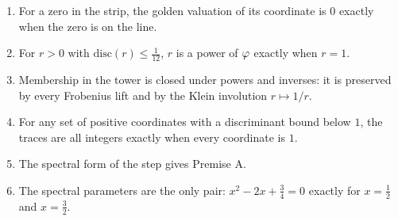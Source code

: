 \begin{proposition}\label{prop:step-coordinate}
\begin{enumerate}[label=\textup{(\roman*)}]
  \item For a zero in the strip, the golden valuation of its coordinate is $0$
    exactly when the zero is on the line.
  \item For $r>0$ with $\mathrm{disc}(r)\le\tfrac1{12}$, $r$ is a power of $\varphi$
    exactly when $r=1$.
  \item Membership in the tower is closed under powers and inverses: it is preserved
    by every Frobenius lift and by the Klein involution $r\mapsto1/r$.
  \item For any set of positive coordinates with a discriminant bound below $1$, the
    traces are all integers exactly when every coordinate is $1$.
  \item The spectral form of the step gives Premise A.
  \item The spectral parameters are the only pair: $x^2-2x+\tfrac34=0$ exactly for
    $x=\tfrac12$ and $x=\tfrac32$.
\end{enumerate}
%
\end{proposition}

